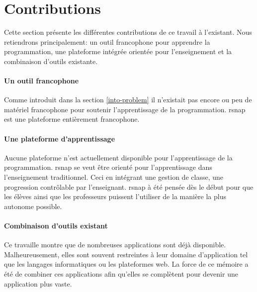 \section{Contributions}
\label{intro-contribution}
Cette section présente les différentes contributions de ce travail à l'existant. Nous retiendrons principalement: un outil francophone pour apprendre la programmation, une plateforme intégrée orientée pour l'enseignement et la combinaison d'outils existante.

\paragraph{Un outil francophone} Comme introduit dans la section \ref{into-problem} il n'existait pas encore ou peu de matériel francophone pour soutenir l'apprentissage de la programmation. \gls{rsnap} est une plateforme entièrement francophone.%

\paragraph{Une plateforme d'apprentissage} Aucune plateforme n'est actuellement disponible pour l'apprentissage de la programmation. \gls{rsnap} se veut être orienté pour l'apprentissage dans l'enseignement traditionnel. Ceci en intégrant une gestion de classe, une progression contrôlable par l'enseignant. \gls{rsnap} à été pensée dès le début pour que les élèves ainsi que les professeurs puissent l'utiliser de la manière la plus autonome possible.

\paragraph{Combinaison d'outils existant} Ce travaille montre que de nombreuses applications sont déjà disponible. Malheureusement, elles sont souvent restreintes à leur domaine d'application tel que les langages informatiques ou les plateformes web. La force de ce mémoire a été de combiner ces applications afin qu'elles se complètent pour devenir une application plus vaste.
